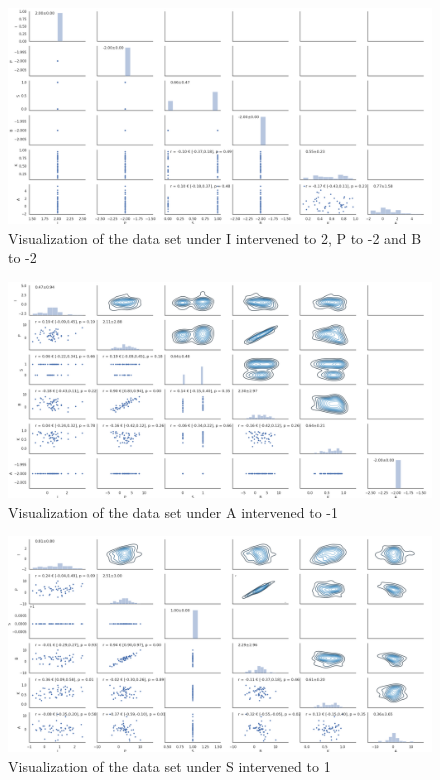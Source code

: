 \documentclass[12pt,fleqn,]{article}
\begin{document}
\begin{figure}[H]
	\centering
	\includegraphics[width=\linewidth]{interIPBdata}
	\caption{Visualization of the data set under I intervened to 2, P to -2 and B to -2}
	\label{fig:interIPBdata}
\end{figure}
\begin{figure}[H]
	\centering
	\includegraphics[width=\linewidth]{interAdata}
	\caption{Visualization of the data set under A intervened to -1}
	\label{fig:interAdata}
\end{figure}
\begin{figure}[H]
	\centering
	\includegraphics[width=\linewidth]{interSdata}
	\caption{Visualization of the data set under S intervened to 1}
	\label{fig:interSdata}
\end{figure}
\end{document}
